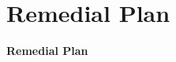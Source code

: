 \label{Remedial}
\section{Remedial Plan}
\renewcommand{\insertclass}{}
\renewcommand{\insertsubject}{}
\begin{frame}
\begin{center}
\begin{Huge}
     \textbf{Remedial Plan}
\end{Huge}
\end{center}
\end{frame}
\normalsize

